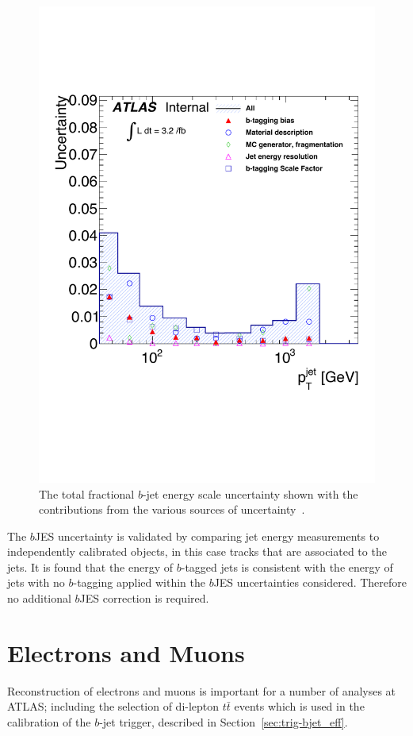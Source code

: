 \begin{figure}[!hbt]
 \vspace{-1em}  
  \begin{center}
    \includegraphics[width=0.53\linewidth, angle=0]{figs/Objects/bjets_bJES_uncert_edit.pdf}
  \vspace{-2em}
  \end{center}
  \caption[The total fractional $b$-jet energy scale uncertainty shown with the contributions from the various sources of uncertainty.]
          {\label{fig:obj-bjets_bJES_uncert} The total fractional $b$-jet energy scale uncertainty
          shown with the contributions from the various sources of uncertainty~\cite{dibjet-int_mori16}.}
\end{figure}

The $b$JES uncertainty is validated by comparing jet energy measurements to independently calibrated objects, in this case tracks that are associated to the jets.
It is found that the energy of $b$-tagged jets is consistent with the energy of jets with no $b$-tagging applied
within the $b$JES uncertainties considered. Therefore no additional $b$JES correction is required.

\section{Electrons and Muons}
\label{sec:obj-leptons}

Reconstruction of electrons and muons
is important for a number of analyses at ATLAS;
including the selection of di-lepton $t\bar{t}$ events
which is used in the calibration of  the $b$-jet trigger,
described in Section~\ref{sec:trig-bjet_eff}.

